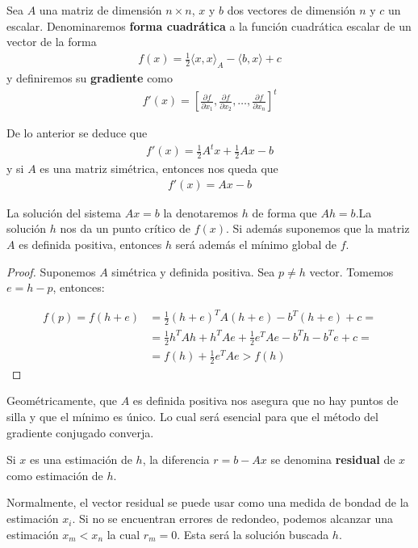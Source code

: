 \begin{definition} Sea $A$ una matriz de dimensión $n\times n$, $x$ y $b$ dos vectores de dimensión $n$ y $c$ un escalar. Denominaremos \textbf{forma cuadrática} a la función cuadrática escalar de un vector de la forma
\begin{gather*}f(x)=\frac{1}{2}\langle{x, x\rangle}_A-\langle{b, x\rangle}+c\end{gather*}
y definiremos su \textbf{gradiente} como
\begin{gather*}f'(x)=\left[\frac{\partial f}{\partial x_1}, \frac{\partial f}{\partial x_2}, \ldots, \frac{\partial f}{\partial x_n}\right]^t\end{gather*}
\end{definition}
De lo anterior se deduce que
\begin{gather*}f'(x)=\frac{1}{2}A^tx+\frac{1}{2}Ax-b\end{gather*}
y si $A$ es una matriz simétrica, entonces nos queda que
\begin{gather*}f'(x)=Ax-b\end{gather*}

La solución del sistema $Ax=b$ la denotaremos $h$ de forma que $Ah=b$.La solución $h$ nos da un punto crítico de $f(x)$. Si además suponemos que la matriz $A$ es definida positiva, entonces $h$ será además el mínimo global de $f$.

\begin{proof}
	
Suponemos $A$ simétrica y definida positiva. Sea $p \neq h$ vector. Tomemos $e = h - p$, entonces:

\begin{align*}
	f(p) = f(h+e) &= \frac{1}{2} (h+e)^TA(h+e)-b^T(h+e) + c = \\
               	&= \frac{1}{2} h^TAh + h^TAe + \frac{1}{2} e^TAe -b^Th -b^Te  + c = \\
               	&= f(h) + \frac{1}{2}e^TAe > f(h)
\end{align*}

\end{proof}

Geométricamente, que $A$ es definida positiva nos asegura que no hay puntos de silla y que el mínimo es único. Lo cual será esencial para que el método del gradiente conjugado converja.

Si $x$ es una estimación de $h$, la diferencia $r=b-Ax$ se denomina \textbf{residual} de $x$ como estimación de $h$.

Normalmente, el vector residual se puede usar como una medida de bondad de la estimación $x_i$. Si no se encuentran errores de redondeo, podemos alcanzar una estimación $x_m<x_n$ la cual $r_m=0$. Esta será la solución buscada $h$.

